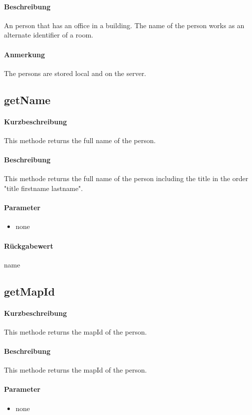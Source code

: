 \paragraph*{Beschreibung}
An person that has an office in a building. The name of the person works as an alternate identifier of a room.
\paragraph*{Anmerkung}
The persons are stored local and on the server.

\subsection{getName}%
\paragraph*{Kurzbeschreibung}
This methode returns the full name of the person.
\paragraph*{Beschreibung}
This methode returns the full name of the person including the title in the order "title firstname lastname".
\paragraph*{Parameter}
\begin{itemize}
    \item none
\end{itemize}
\paragraph*{Rückgabewert}
name

\subsection{getMapId}
\paragraph*{Kurzbeschreibung}
This methode returns the mapId of the person.
\paragraph*{Beschreibung}
This methode returns the mapId of the person.
\paragraph*{Parameter}
\begin{itemize}
    \item none
\end{itemize}
